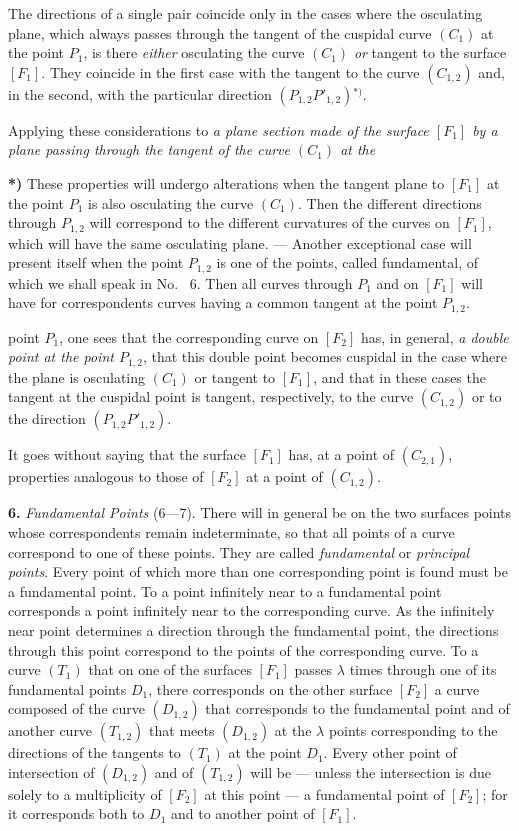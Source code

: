 \documentclass{article}
\begin{document}
The directions of a single pair coincide only in the cases where the osculating plane, which always passes through the tangent of the cuspidal curve $(C_1)$ at the point $P_1$, is there \emph{either} osculating the curve $(C_1)$ \emph{or} tangent to the surface $[F_1]$. They coincide in the first case with the tangent to the curve $(C_{1, 2})$ and, in the second, with the particular direction $(P_{1, 2} P'_{1, 2})$${}^{*)}$.

Applying these considerations to \emph{a plane section made of the surface $[F_1]$ by a plane passing through the tangent of the curve $(C_1)$ at the}

\textbf{*)} These properties will undergo alterations when the tangent plane to $[F_1]$ at the point $P_1$ is also osculating the curve $(C_1)$. Then the different directions through $P_{1, 2}$ will correspond to the different curvatures of the curves on $[F_1]$, which will have the same osculating plane. --- Another exceptional case will present itself when the point $P_{1, 2}$ is one of the points, called fundamental, of which we shall speak in No.~ 6. Then all curves through $P_1$ and on $[F_1]$ will have for correspondents curves having a common tangent at the point $P_{1, 2}$.

point $P_1$, one sees that the corresponding curve on $[F_2]$ has, in general, \emph{a double point at the point $P_{1, 2}$}, that this double point becomes cuspidal in the case where the plane is osculating $(C_1)$ or tangent to $[F_1]$, and that in these cases the tangent at the cuspidal point is tangent, respectively, to the curve $(C_{1, 2})$ or to the direction $(P_{1, 2} P'_{1, 2})$.

It goes without saying that the surface $[F_1]$ has, at a point of $(C_{2, 1})$, properties analogous to those of $[F_2]$ at a point of $(C_{1, 2})$.

\textbf{6.} \emph{Fundamental Points} (6---7). There will in general be on the two surfaces points whose correspondents remain indeterminate, so that all points of a curve correspond to one of these points. They are called \emph{fundamental} or \emph{principal points}. Every point of which more than one corresponding point is found must be a fundamental point. To a point infinitely near to a fundamental point corresponds a point infinitely near to the corresponding curve. As the infinitely near point determines a direction through the fundamental point, the directions through this point correspond to the points of the corresponding curve. To a curve $(T_1)$ that on one of the surfaces $[F_1]$ passes $\lambda$ times through one of its fundamental points $D_1$, there corresponds on the other surface $[F_2]$ a curve composed of the curve $(D_{1, 2})$ that corresponds to the fundamental point and of another curve $(T_{1, 2})$ that meets $(D_{1, 2})$ at the $\lambda$ points corresponding to the directions of the tangents to $(T_1)$ at the point $D_1$. Every other point of intersection of $(D_{1, 2})$ and of $(T_{1, 2})$ will be --- unless the intersection is due solely to a multiplicity of $[F_2]$ at this point --- a fundamental point of $[F_2]$; for it corresponds both to $D_1$ and to another point of $[F_1]$.
\end{document}
